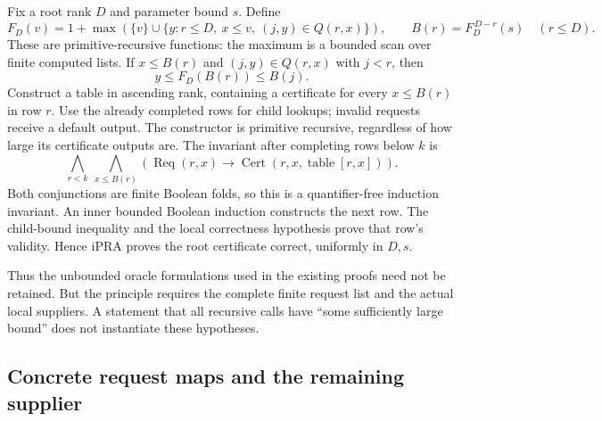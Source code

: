 Fix a root rank $D$ and parameter bound $s$. Define
\[
 F_D(v)=1+\max\left(\{v\}\cup
  \{y: r\le D,\ x\le v,\ (j,y)\in Q(r,x)\}\right),
 \qquad B(r)=F_D^{\,D-r}(s)\quad(r\le D).
\]
These are primitive-recursive functions: the maximum is a bounded scan
over finite computed lists. If $x\le B(r)$ and $(j,y)\in Q(r,x)$
with $j<r$, then
\[
 y\le F_D(B(r))\le B(j).
\]
Construct a table in ascending rank, containing a certificate for
every $x\le B(r)$ in row $r$. Use the already completed rows for child
lookups; invalid requests receive a default output. The constructor is
primitive recursive, regardless of how large its certificate outputs
are. The invariant after completing rows below $k$ is
\[
 \bigwedge_{r<k}\ \bigwedge_{x\le B(r)}
 \left(\operatorname{Req}(r,x)\to
       \operatorname{Cert}(r,x,\operatorname{table}[r,x])\right).
\]
Both conjunctions are finite Boolean folds, so this is a
quantifier-free induction invariant. An inner bounded Boolean
induction constructs the next row. The child-bound inequality and the
local correctness hypothesis prove that row's validity. Hence iPRA
proves the root certificate correct, uniformly in $D,s$.

Thus the unbounded oracle formulations used in the existing proofs
need not be retained. But the principle requires the complete finite
request list and the actual local suppliers. A statement that all
recursive calls have ``some sufficiently large bound'' does not
instantiate these hypotheses.

\subsection{Concrete request maps and the remaining supplier}

